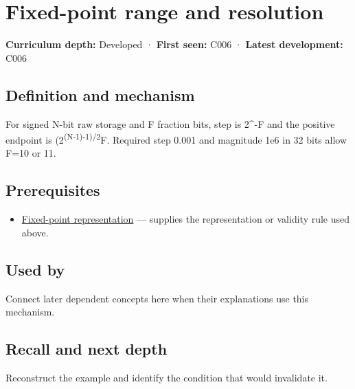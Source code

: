 \hypertarget{appendix-ceb4c4a9b5a1}{}\label{referencestart:appendix-ceb4c4a9b5a1}
\section{Fixed-point range and resolution}\label{appendix-ceb4c4a9b5a1-fixed-point-range-and-resolution}

\textbf{Curriculum depth:} Developed · \textbf{First seen:} C006 · \textbf{Latest development:} C006

\begin{allmightroledefinition}

\subsection{Definition and mechanism}\label{appendix-ceb4c4a9b5a1-definition-and-mechanism}

For signed N-bit raw storage and F fraction bits, step is 2\^{}-F and the positive endpoint is (2\textsuperscript{(N-1)-1)/2}F. Required step 0.001 and magnitude 1e6 in 32 bits allow F=10 or 11.

\end{allmightroledefinition}

\subsection{Prerequisites}\label{appendix-ceb4c4a9b5a1-prerequisites}

\begin{itemize}
\tightlist
\item
  \hyperref[appendix-1d0dbe8924cc]{Fixed-point representation} --- supplies the representation or validity rule used above.
\end{itemize}

\subsection{Used by}\label{appendix-ceb4c4a9b5a1-used-by}

Connect later dependent concepts here when their explanations use this mechanism.

\subsection{Recall and next depth}\label{appendix-ceb4c4a9b5a1-recall-and-next-depth}

Reconstruct the example and identify the condition that would invalidate it.

